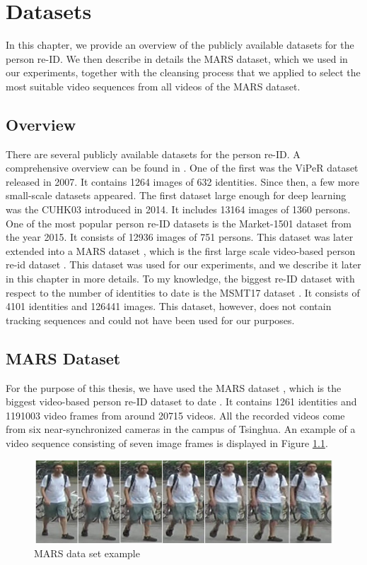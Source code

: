 \chapter{Datasets} \label{ch:data_sets}
In this chapter, we provide an overview of the publicly available datasets for the person re-ID. We then describe in details the MARS dataset, which we used in our experiments, together with the cleansing process that we applied to select the most suitable video sequences from all videos of the MARS dataset.
\section{Overview}
There are several publicly available datasets for the person re-ID. A comprehensive overview can be found in \cite{re_ID_data_overview}. One of the first was the ViPeR dataset \cite{ViPeR} released in 2007. It contains 1264 images of 632 identities. Since then, a few more small-scale datasets appeared. The first dataset large enough for deep learning was the CUHK03 \cite{cuhk03} introduced in 2014. It includes 13164 images of 1360 persons. One of the most popular person re-ID datasets is the Market-1501 dataset \cite{market_dataset} from the year 2015. It consists of 12936 images of 751 persons. This dataset was later extended into a MARS dataset \cite{MARS}, which is the first large scale video-based person re-id dataset \cite{re_ID_data_overview}. This dataset was used for our experiments, and we describe it later in this chapter in more details. To my knowledge, the biggest re-ID dataset with respect to the number of identities to date is the MSMT17 dataset \cite{MSMT17}. It consists of 4101 identities and 126441 images. This dataset, however, does not contain tracking sequences and could not have been used for our purposes.
\section{MARS Dataset}
For the purpose of this thesis, we have used the MARS dataset \cite{MARS}, which is the biggest video-based person re-ID dataset to date \cite{re_ID_data_overview}. It contains 1261 identities and 1191003 video frames from around 20715 videos. All the recorded videos come from six near-synchronized cameras in the campus of Tsinghua. An example of a video sequence consisting of seven image frames is displayed in Figure
\ref{fig:mars_example}.

\begin{figure}[h!]
    \centering
    \includegraphics[scale=0.4]{figures/0006C2T0002F016_22.jpg}
    \caption{MARS data set example} 
    \label{fig:mars_example}
\end{figure}


